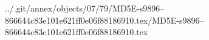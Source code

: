 ../.git/annex/objects/07/79/MD5E-s9896--866644c83e101e621ff0e06f88186910.tex/MD5E-s9896--866644c83e101e621ff0e06f88186910.tex